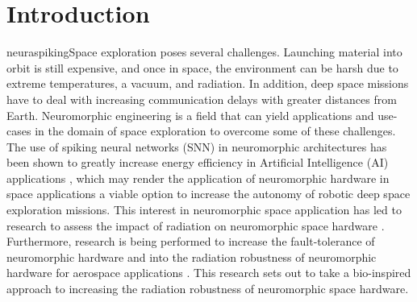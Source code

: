 \section{Introduction}\label{sec:introduction}
 neuraspikingSpace exploration poses several challenges. Launching material into orbit is still expensive, and once in space, the environment can be harsh due to extreme temperatures, a vacuum, and radiation. In addition, deep space missions have to deal with increasing communication delays with greater distances from Earth. Neuromorphic engineering is a field that can yield applications and use-cases in the domain of space exploration to overcome some of these challenges. The use of spiking neural networks (SNN) in neuromorphic architectures has been shown to greatly increase energy efficiency in Artificial Intelligence (AI) applications\cite{todo}\cite{todo}%
, which may render the application of neuromorphic hardware in space applications a viable option to increase the autonomy of robotic deep space exploration missions. 
This interest in neuromorphic space application has led to research to assess the impact of radiation on neuromorphic space hardware \cite{cantley_impact_2021,roffe_neutron-induced_2021}. Furthermore, research is being performed to increase the fault-tolerance of neuromorphic hardware \cite{tran_design_2011} and into the radiation robustness of neuromorphic hardware for aerospace applications \cite{vaz_cmos_2020}. This research sets out to take a bio-inspired approach to increasing the radiation robustness of neuromorphic space hardware.

